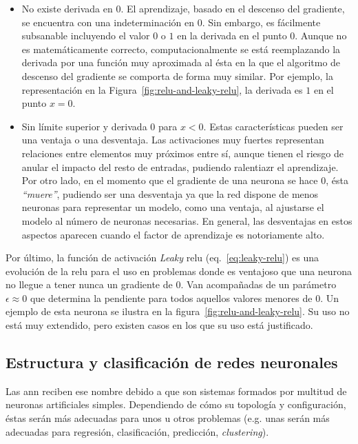 \begin{itemize}
	\item No existe derivada en $0$. El aprendizaje, basado en el descenso del gradiente, se encuentra con una indeterminación en $0$. Sin embargo, es fácilmente subsanable incluyendo el valor $0$ o $1$ en la derivada en el punto $0$. Aunque no es matemáticamente correcto, computacionalmente se está reemplazando la derivada por una función muy aproximada al ésta en la que el algoritmo de descenso del gradiente se comporta de forma muy similar. Por ejemplo, la representación en la Figura~\ref{fig:relu-and-leaky-relu}, la derivada es $1$ en el punto $x = 0$.
	\item Sin límite superior y derivada $0$ para $x < 0$. Estas características pueden ser una ventaja o una desventaja. Las activaciones muy fuertes representan relaciones entre elementos muy próximos entre sí, aunque tienen el riesgo de anular el impacto del resto de entradas, pudiendo ralentiazr el aprendizaje. Por otro lado, en el momento que el gradiente de una neurona se hace 0, ésta \textit{\enquote{muere}}, pudiendo ser una desventaja ya que la red dispone de menos neuronas para representar un modelo, como una ventaja, al ajustarse el modelo al número de neuronas necesarias. En general, las desventajas en estos aspectos aparecen cuando el factor de aprendizaje es notoriamente alto.
\end{itemize}

Por último, la función de activación \textit{Leaky} \gls{relu} (eq.~\ref{eq:leaky-relu}) es una evolución de la \gls{relu} para el uso en problemas donde es ventajoso que una neurona no llegue a tener nunca un gradiente de 0. Van acompañadas de un parámetro $\epsilon \approx 0$ que determina la pendiente para todos aquellos valores menores de 0. Un ejemplo de esta neurona se ilustra en la figura~\ref{fig:relu-and-leaky-relu}. Su uso no está muy extendido, pero existen casos en los que su uso está justificado.

\subsection{Estructura y clasificación de redes neuronales}

Las \gls{ann} reciben ese nombre debido a que son sistemas formados por multitud de neuronas artificiales simples. Dependiendo de cómo su topología y configuración, éstas serán más adecuadas para unos u otros problemas (e.g. unas serán más adecuadas para regresión, clasificación, predicción, \textit{clustering}).

